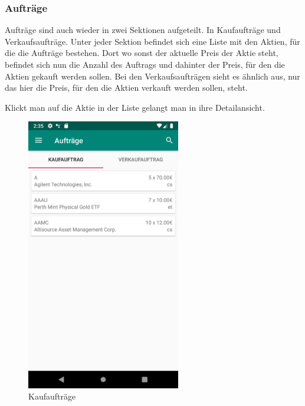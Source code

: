 \documentclass[10pt]{scrartcl}
\begin{document}
\subsubsection{Aufträge}

Aufträge sind auch wieder in zwei Sektionen aufgeteilt. In Kaufaufträge und Verkaufsaufträge. Unter jeder Sektion befindet sich eine Liste mit den Aktien, für die die Aufträge bestehen. Dort wo sonst der aktuelle Preis der Aktie steht, befindet sich nun die Anzahl des Auftrags und dahinter der Preis, für den die Aktien gekauft werden sollen. Bei den Verkaufsaufträgen sieht es ähnlich aus, nur das hier die Preis, für den die Aktien verkauft werden sollen, steht.

Klickt man auf die Aktie in der Liste gelangt man in ihre Detailansicht.

\begin{figure}[H]
	\centering
	\includegraphics[width=0.6\textwidth]{Bilder/Applikation/Kaufauftrag.png}
	\caption{Kaufaufträge}
\end{figure}
\end{document}
